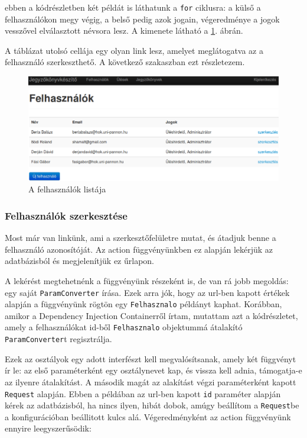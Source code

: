 \documentclass[a4paper,12pt,oneside]{report}
\begin{document}
ebben a kódrészletben két példát is láthatunk a {\tt for} ciklusra: a külső a felhasználókon megy végig, a belső pedig azok jogain, végeredménye a jogok vesszővel elválasztott névsora lesz. A kimenete látható a \ref{fig:felhasznalo_lista}. ábrán.

A táblázat utolsó cellája egy olyan link lesz, amelyet meglátogatva az a felhasználó szerkeszthető. A következő szakaszban ezt részletezem.

\begin{figure}[h]
    \includegraphics[width=\textwidth]{felhasznalo_lista.png}
    \caption{A felhasználók listája}
    \label{fig:felhasznalo_lista}
\end{figure}

\subsubsection*{Felhasználók szerkesztése}

Most már van linkünk, ami a szerkesztőfelületre mutat, és átadjuk benne a felhasználó azonosítóját. Az action függvényünkben ez alapján lekérjük az adatbázisból és megjelenítjük ez űrlapon.

A lekérést megtehetnénk a függvényünk részeként is, de van rá jobb megoldás: egy saját {\tt ParamConverter} írása. Ezek arra jók, hogy az url-ben kapott értékek alapján a függvényünk rögtön egy {\tt Felhasznalo} példányt kaphat. Korábban, amikor a Dependency Injection Containerről írtam, mutattam azt a kódrészletet, amely a felhasználókat id-ből {\tt Felhasznalo} objektummá átalakító {\tt ParamConverter}t regisztrálja.

Ezek az osztályok egy adott interfészt kell megvalósítsanak, amely két függvényt ír le: az első paraméterként egy osztálynevet kap, és vissza kell adnia, támogatja-e az ilyenre átalakítást. A második magát az alakítást végzi paraméterként kapott {\tt Request} alapján. Ebben a példában az url-ben kapott {\tt id} paraméter alapján kérek az adatbázisból, ha nincs ilyen, hibát dobok, amúgy beállítom a {\tt Request}be a konfigurációban beállitott kulcs alá. Végeredményként az action függvényünk ennyire leegyszerűsödik:
\end{document}

